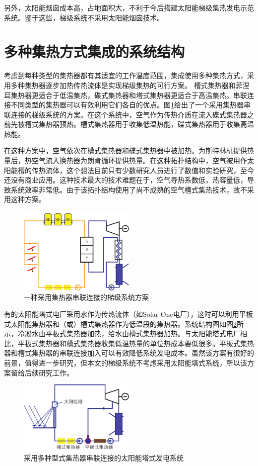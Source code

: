 另外，太阳能烟囱成本高，占地面积大，不利于今后搭建太阳能梯级集热发电示范系统。鉴于这些，梯级系统不采用太阳能烟囱技术。

\section{多种集热方式集成的系统结构}
\label{sec:csc}
考虑到每种类型的集热器都有其适宜的工作温度范围，集成使用多种集热方式，采用多种集热器逐步加热传热流体是实现梯级集热的可行方案。
槽式集热器和菲涅耳集热器更适合于低温集热，碟式集热器和塔式集热器更适合于高温集热。串联连接不同类型的集热器可以有效利用它们各自的优点。图\ref{fig:SeriesCollector}给出了一个采用集热器串联连接的梯级系统的方案。在这个系统中，空气作为传热介质在流入碟式集热器之前先被槽式集热器预热。槽式集热器用于收集低温热能，碟式集热器用于收集高温热能。

在这种方案中，空气依次在槽式集热器和碟式集热器中被加热。为斯特林机提供热量后，热空气流入换热器为朗肯循环提供热量。在这种拓扑结构中，空气被用作太阳能槽的传热流体，这个想法目前只有少数研究人员进行了数值和实验研究，至今还没有商业应用\cite{Good2015,Good2016}。这种技术最大的技术难题在于，空气导热系数低，热容量低，导致系统效率非常低。由于该拓扑结构使用了尚不成熟的空气槽式集热技术，故不采用这种方案。
\begin{figure}[htbp]
\centering 
\includegraphics[width=0.5\textwidth]{fig/SeriesCollector}
\caption{一种采用集热器串联连接的梯级系统方案}\label{fig:SeriesCollector}
\end{figure}

有的太阳能塔式电厂采用水作为传热流体（如Solar One电厂），这时可以利用平板式太阳能集热器和（或）槽式集热器作为低温段的集热器。系统结构图如图\ref{fig:seriesCollection}所示，冷凝水由平板式集热器加热，给水由槽式集热器加热。与太阳能塔式电厂相比，平板式集热器和槽式集热器收集低温热量的单位热成本要低很多。平板式集热器和槽式集热器的串联连接加入可以有效降低系统发电成本。虽然该方案有很好的前景，值得进一步研究，但本文的梯级系统不考虑采用太阳能塔式系统，所以该方案留给后续研究工作。

\begin{figure}[htbp]
\centering 
\includegraphics[width=0.5\textwidth]{fig/SeriesCollection}
\caption{采用多种型式集热器串联连接的太阳能塔式发电系统}\label{fig:seriesCollection}
\end{figure}

